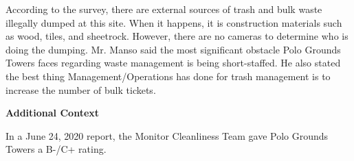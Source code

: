 According to the survey, there are external sources of trash and bulk waste illegally dumped at this site. When it happens, it is construction materials such as wood, tiles, and sheetrock. However, there are no cameras to determine who is doing the dumping. Mr. Manso said the most significant obstacle Polo Grounds Towers faces regarding waste management is being short-staffed. He also stated the best thing Management/Operations has done for trash management is to increase the number of bulk tickets.

\textbf{Additional Context} 

 

In a June 24, 2020 report, the Monitor Cleanliness Team gave Polo Grounds Towers a B-/C+ rating.  

 